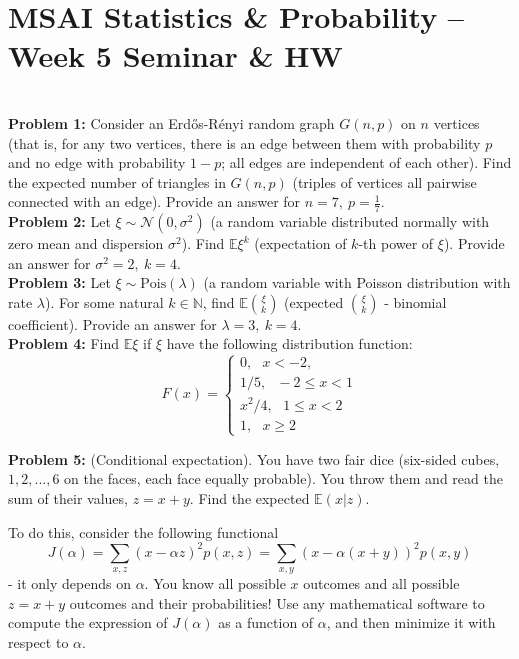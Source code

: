 \documentclass[12pt]{article}
\numberwithin{equation}{section}
\begin{document}
\section*{MSAI Statistics \& Probability – Week 5 Seminar \& HW}\\

\textbf{Problem 1:} Consider an Erd\H{o}s-R\'{e}nyi random graph $G(n,p)$ on $n$ vertices (that is, for any two vertices, there is an edge between them with probability $p$ and no edge with probability $1-p$; all edges are independent of each other). Find the expected number of triangles in $G(n,p)$ (triples of vertices all pairwise connected with an edge). Provide an answer for $n=7,~p=\frac{1}{7}.$
\\

\textbf{Problem 2:} Let $\xi\sim\mathcal{N}(0,\sigma^2)$ (a random variable distributed normally with zero mean and dispersion $\sigma^2$). Find $\mathbb{E}\xi^k$ (expectation of $k$-th power of $\xi$). Provide an answer for $\sigma^2 = 2,~k=4.$
\\

\textbf{Problem 3:} Let $\xi\sim\textrm{Pois}(\lambda)$ (a random variable with Poisson distribution with rate $\lambda$). For some natural $k\in\mathbb{N}$, find $\mathbb{E}{\xi\choose k}$ (expected ${\xi\choose k}$ - binomial coefficient). Provide an answer for $\lambda=3,~k=4.$
\\

\textbf{Problem 4:} Find $\mathbb{E}\xi$ if $\xi$ have the following distribution function:
$$F(x)=
\begin{cases}
0, ~~~ x<-2,\\
1/5, ~~~-2\leq x<1 \\
x^2/4, ~~~1\leq x<2 \\
1, ~~~ x\geq 2
\end{cases}$$

\textbf{Problem 5:} (Conditional expectation). You have two fair dice (six-sided cubes, $1,2,...,6$ on the faces, each face equally probable). You throw them and read the sum of their values, $z=x+y$. Find the expected $\mathbb{E}(x|z).$ 

To do this, consider the following functional 
$$J(\alpha)=\sum_{x,z}(x-\alpha z)^2p(x,z)=\sum_{x,y}(x-\alpha (x+y))^2p(x,y)$$
- it only depends on $\alpha$. You know all possible $x$ outcomes and all possible $z=x+y$ outcomes and their probabilities! Use any mathematical software to compute the expression of $J(\alpha)$ as a function of $\alpha$, and then minimize it with respect to $\alpha.$
\end{document}
